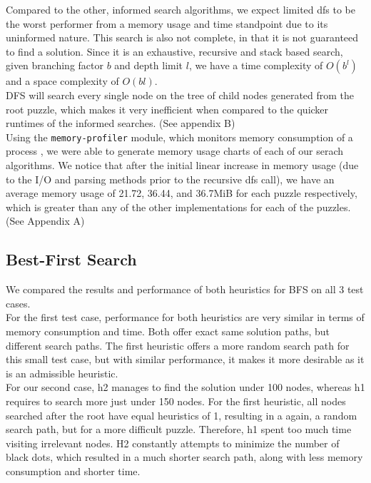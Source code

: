 \documentclass[runningheads]{llncs}
\begin{document}
Compared to the other, informed search algorithms, we expect limited dfs to be the worst performer from a memory usage and time standpoint due to its uninformed nature. This search is also not complete, in that it is not guaranteed to find a solution. Since it is an exhaustive, recursive and stack based search, given branching factor $b$ and depth limit $l$, we have a time complexity of $O(b^l)$ and a space complexity of $O(bl)$. \cite{ref_2} \\

DFS will search every single node on the tree of child nodes generated from the root puzzle, which makes it very inefficient when compared to the quicker runtimes of the informed searches. (See appendix B)\\

Using the \verb|memory-profiler| module, which monitors memory consumption of a process \cite{ref_1}, we were able to generate memory usage charts of each of our serach algorithms. We notice that after the initial linear increase in memory usage (due to the I/O and parsing methods prior to the recursive dfs call), we have an average memory usage of 21.72, 36.44, and 36.7MiB for each puzzle respectively, which is greater than any of the other implementations for each of the puzzles. (See Appendix A)

\subsection{Best-First Search}

We compared the results and performance of both heuristics for BFS on all 3 test cases. \\

For the first test case, performance for both heuristics are very similar in terms of memory consumption and time. Both offer exact same solution paths, but different search paths. The first heuristic offers a more random search path for this small test case, but with similar performance, it makes it more desirable as it is an admissible heuristic. \\

For our second case, h2 manages to find the solution under 100 nodes, whereas h1 requires to search more just under 150 nodes. For the first heuristic, all nodes searched after the root have equal heuristics of 1, resulting in a again, a random search path, but for a more difficult puzzle. Therefore, h1 spent too much time visiting irrelevant nodes. H2 constantly attempts to minimize the number of black dots, which resulted in a much shorter search path, along with less memory consumption and shorter time. \\
\end{document}
